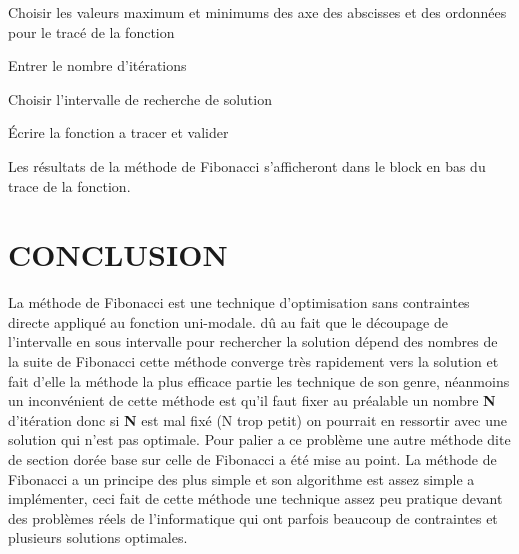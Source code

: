 \documentclass[a4paper,14pt]{article}
\begin{document}
\begin{list}{•}{}
\item Choisir les valeurs maximum et minimums des axe des abscisses et des ordonnées pour le tracé de la fonction
\item Entrer le nombre d'itérations
\item Choisir l'intervalle de recherche de solution
\item Écrire la fonction a tracer et valider
\end{list}

Les résultats de la méthode de Fibonacci s'afficheront dans le block en bas du trace de la fonction.

\pagebreak

\section*{CONCLUSION}
La méthode de Fibonacci est une technique d'optimisation sans contraintes directe appliqué au fonction uni-modale. dû au fait que le découpage de l'intervalle en sous intervalle pour rechercher la solution dépend des nombres de la suite de Fibonacci cette méthode converge très rapidement vers la solution et fait d'elle la méthode la plus efficace partie les technique de son genre, néanmoins un inconvénient de cette méthode est qu'il faut fixer au préalable un nombre \textbf{N} d'itération donc si \textbf{N} est mal fixé (N trop petit) on pourrait en ressortir avec une solution qui n'est pas optimale. Pour palier a ce problème une autre méthode dite de section dorée base sur celle de Fibonacci a été mise au point. La méthode de Fibonacci a un principe des plus simple et son algorithme est assez simple a implémenter, ceci fait de cette méthode une technique assez peu pratique devant des problèmes réels de l'informatique qui ont parfois beaucoup de contraintes et plusieurs solutions optimales. 
\end{document}
